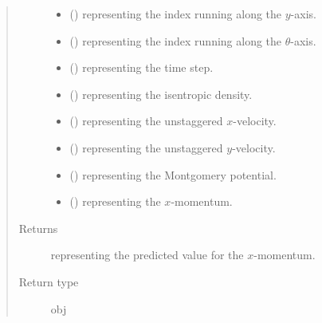 \documentclass[letterpaper,10pt,english]{sphinxmanual}
\begin{document}
\begin{fulllineitems}
\begin{fulllineitems}
\begin{quote}
\begin{description}
\begin{itemize}
\item {} 
 () \textendash{}  representing the index running along the \(y\)-axis.

\item {} 
 () \textendash{}  representing the index running along the \(\theta\)-axis.

\item {} 
 () \textendash{}  representing the time step.

\item {} 
 () \textendash{}  representing the isentropic density.

\item {} 
 () \textendash{}  representing the unstaggered \(x\)-velocity.

\item {} 
 () \textendash{}  representing the unstaggered \(y\)-velocity.

\item {} 
 () \textendash{}  representing the Montgomery potential.

\item {} 
 () \textendash{}  representing the \(x\)-momentum.

\end{itemize}

\item[{Returns}] \leavevmode
{} representing the predicted value for the \(x\)-momentum.

\item[{Return type}] \leavevmode
obj

\end{description}\end{quote}

\end{fulllineitems}


\end{fulllineitems}
\end{document}
